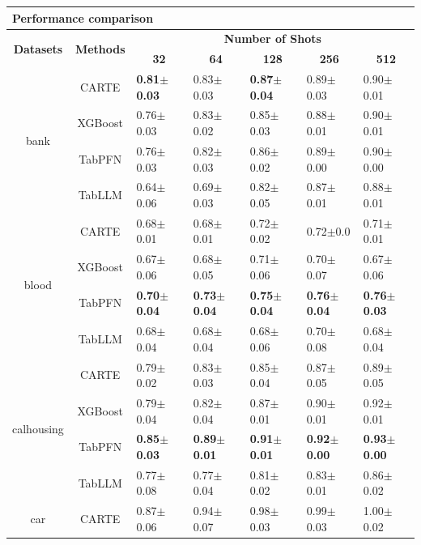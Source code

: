 \documentclass{article}
\theoremstyle{plain}
\theoremstyle{definition}
\theoremstyle{remark}
\begin{document}
\begin{table}[!p]
\begin{center}
\begin{tabular}{cclllll}
\\
\multicolumn{7}{l}{\hspace{-0.7em}\textbf{Performance comparison}\vspace{1mm}}\\%
\toprule
\multicolumn{1}{c}{\multirow{2}{*}{\textbf{Datasets}}} & \multicolumn{1}{c}{\multirow{2}{*}{\textbf{Methods}}} & \multicolumn{5}{c}{\textbf{Number of Shots}} \\ 
\cmidrule(r){3-7}
& & \multicolumn{1}{c}{\textbf{32}}  & \multicolumn{1}{c}{\textbf{64}}  & \multicolumn{1}{c}{\textbf{128}} & \multicolumn{1}{c}{\textbf{256}} & \multicolumn{1}{c}{\textbf{512}} \\
\midrule
\multirow{4}{*}{bank} & CARTE & \textbf{0.81$\pm$0.03} &  0.83$\pm$0.03 &  \textbf{0.87$\pm$0.04} &  0.89$\pm$0.03 &   0.90$\pm$0.01 \\
& XGBoost & 0.76$\pm$0.03 & 0.83$\pm$0.02 & 0.85$\pm$0.03 & 0.88$\pm$0.01 & 0.90$\pm$0.01 \\
& TabPFN & 0.76$\pm$0.03 & 0.82$\pm$0.03 & 0.86$\pm$0.02 & 0.89$\pm$0.00 & 0.90$\pm$0.00 \\
& TabLLM & 0.64$\pm$0.06 & 0.69$\pm$0.03 & 0.82$\pm$0.05 & 0.87$\pm$0.01 & 0.88$\pm$0.01 \\
\midrule
\multirow{4}{*}{blood} & CARTE & 0.68$\pm$0.01 &  0.68$\pm$0.01 &  0.72$\pm$0.02 &   0.72$\pm$0.0 &  0.71$\pm$0.01 \\
& XGBoost & 0.67$\pm$0.06 & 0.68$\pm$0.05 & 0.71$\pm$0.06 & 0.70$\pm$0.07 & 0.67$\pm$0.06 \\
& TabPFN & \textbf{0.70$\pm$0.04} & \textbf{0.73$\pm$0.04} & \textbf{0.75$\pm$0.04} & \textbf{0.76$\pm$0.04} & \textbf{0.76$\pm$0.03} \\
& TabLLM & 0.68$\pm$0.04 & 0.68$\pm$0.04 & 0.68$\pm$0.06 & 0.70$\pm$0.08 & 0.68$\pm$0.04 \\
\midrule
\multirow{4}{*}{calhousing} & CARTE & 0.79$\pm$0.02 &  0.83$\pm$0.03 &  0.85$\pm$0.04 &  0.87$\pm$0.05 &  0.89$\pm$0.05 \\
& XGBoost & 0.79$\pm$0.04 & 0.82$\pm$0.04 & 0.87$\pm$0.01 & 0.90$\pm$0.01 & 0.92$\pm$0.01 \\
& TabPFN & \textbf{0.85$\pm$0.03} & \textbf{0.89$\pm$0.01} & \textbf{0.91$\pm$0.01} & \textbf{0.92$\pm$0.00} & \textbf{0.93$\pm$0.00} \\
& TabLLM & 0.77$\pm$0.08 & 0.77$\pm$0.04 & 0.81$\pm$0.02 & 0.83$\pm$0.01 & 0.86$\pm$0.02 \\
\midrule
\multirow{4}{*}{car} & CARTE & 0.87$\pm$0.06 &  0.94$\pm$0.07 &  0.98$\pm$0.03 &  0.99$\pm$0.03 & 1.00$\pm$0.02 \\

\end{tabular}
\end{center}
\end{table}
\end{document}

